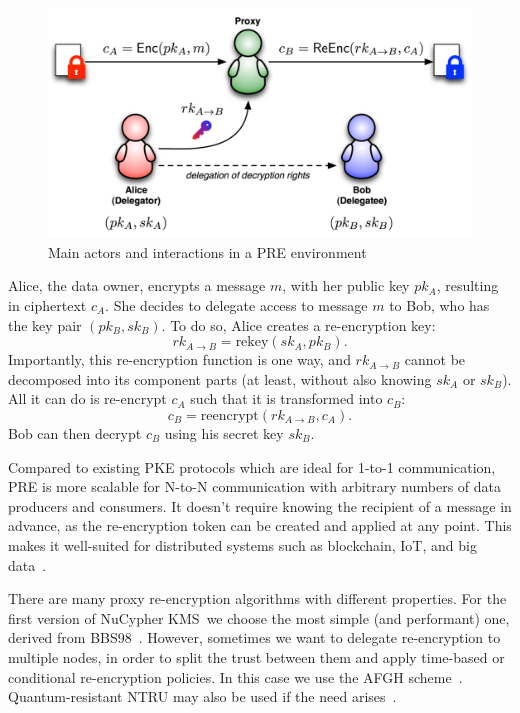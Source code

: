 \documentclass[notitlepage,longbibliography]{revtex4-1}
\newcommand{\kms}{NuCypher KMS}
\begin{document}
\begin{figure}
\centering
    \includegraphics[width=0.6\columnwidth]{pdf/pre.png}  %
    \caption{Main actors and interactions in a PRE environment}
    \label{fig:pre}
\end{figure}

Alice, the data owner, encrypts a message $m$, with her public key $pk_A$, resulting in ciphertext $c_A$.
She decides to delegate access to message $m$ to Bob, who has the key pair $(pk_B, sk_B)$.
To do so, Alice creates a re-encryption key:
\begin{equation}
    rk_{A\rightarrow B} = \text{rekey}(sk_A, pk_B).
\end{equation}
Importantly, this re-encryption function is one way, and $rk_{A\rightarrow B}$ cannot be decomposed into its component parts
(at least, without also knowing $sk_A$ or $sk_B$).
All it can do is re-encrypt $c_A$ such that it is transformed into $c_B$:
\begin{equation}
    c_B = \text{reencrypt}(rk_{A\rightarrow B}, c_{A}).
\end{equation}
Bob can then decrypt $c_{B}$ using his secret key $sk_{B}$.

Compared to existing PKE protocols which are ideal for 1-to-1 communication, PRE is more scalable for N-to-N communication
with arbitrary numbers of data producers and consumers.
It doesn't require knowing the recipient of a message in advance, as the re-encryption token can be created and applied at any point.
This makes it well-suited for distributed systems such as blockchain, IoT, and big data~\cite{web:nucypher-hadoop}.

There are many proxy re-encryption algorithms with different properties.
For the first version of \kms~we choose the most simple (and performant) one, derived from BBS98~\cite{BBS98}.
However, sometimes we want to delegate re-encryption to multiple nodes, in order to split the trust between them and apply time-based or conditional
re-encryption policies.
In this case we use the AFGH scheme~\cite{AFGH}.
Quantum-resistant NTRU may also be used if the need arises~\cite{wiki:ntru,ntrureencrypt}.
\end{document}

